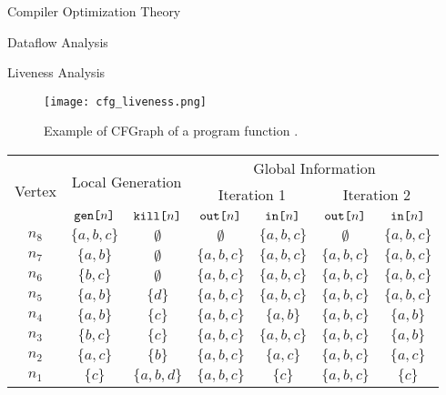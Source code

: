 \begin{section}{Compiler Optimization Theory}
\begin{subsection}{Dataflow Analysis}
\begin{subsubsection}{Liveness Analysis}
\begin{figure}
\centering
	 \texttt{[image: cfg\_liveness.png]}
	  \caption{Example of CFGraph of a program function \citep{khedker2009data}.}
	  \label{fig:cfg_liveness}
\end{figure}

\begin{table}[]
\begin{tabular}{|c|c|c|c|c|c|c|}
\hline
\multirow{3}{*}{Vertex} & \multicolumn{2}{c|}{\multirow{2}{*}{Local Generation}}  & \multicolumn{4}{c|}{Global Information}                             \\ \cline{4-7} 
                        & \multicolumn{2}{c|}{}                                   & \multicolumn{2}{c|}{Iteration 1} & \multicolumn{2}{c|}{Iteration 2} \\ \cline{2-7} 
                        & $\texttt{gen[}n\texttt{]}$                        & $\texttt{kill[} n\texttt{]}$                   & $\texttt{out[} n\texttt{]}$             & $\texttt{in[} n\texttt{]}$             & $\texttt{out[} n\texttt{]}$             & $\texttt{in[} n\texttt{]}$            \\ \hline
$n_8$                   & $\{a, b, c\}$                & $\emptyset          $            & $\emptyset$               & $\{a, b, c\}$    & $\emptyset          $     & $\{a, b, c\}$    \\ \hline
$n_7$                   & $\{a, b\}$                   & $\emptyset          $            & $\{a, b, c\}$     & $\{a, b, c\}$    & $\{a, b, c\}$     & $\{a, b, c\}$    \\ \hline
$n_6$                   & $\{b, c\}$                   & $\emptyset          $            & $\{a, b, c\}$     & $\{a, b, c\}$    & $\{a, b, c\}$     & $\{a, b, c\}$    \\ \hline
$n_5$                   & $\{a, b\}$                   & $\{d\}      $            & $\{a, b, c\}$     & $\{a, b, c\}$    & $\{a, b, c\}$     & $\{a, b, c\}$    \\ \hline
$n_4$                   & $\{a, b\}$                   & $\{c\}      $            & $\{a, b, c\}$     & $\{a, b\}   $    & $\{a, b, c\}$     & $\{a, b\}   $    \\ \hline
$n_3$                   & $\{b, c\}$                   & $\{c\}      $            & $\{a, b, c\}$     & $\{a, b, c\}$    & $\{a, b, c\}$     & $\{a, b\}   $    \\ \hline
$n_2$                   & $\{a, c\}$                   & $\{b\}      $            & $\{a, b, c\}$     & $\{a, c\}   $    & $\{a, b, c\}$     & $\{a, c\}   $    \\ \hline
$n_1$                   & $\{c\}   $                   & $\{a, b, d\}$            & $\{a, b, c\}$     & $\{c\}      $    & $\{a, b, c\}$     & $\{c\}      $    \\ \hline


\end{tabular}
\end{table}
\end{subsubsection}
\end{subsection}
\end{section}

